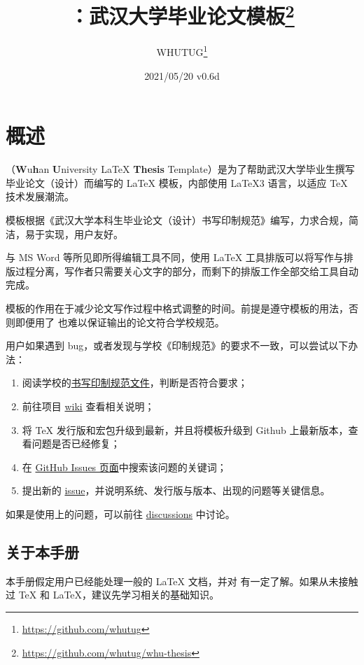 \documentclass{fdudoc}
\title{\cls{whu-thesis}\bfseries ：武汉大学毕业论文模板\thanks{\url{https://github.com/whutug/whu-thesis}}}
\author{WHUTUG\thanks{\url{https://github.com/whutug}}}
\date{2021/05/20 \quad v0.6d}
\begin{document}
\maketitle
\tableofcontents

\section{概述}
（\textbf{W}u\textbf{h}an \textbf{U}niversity \LaTeX{} \textbf{Thesis} Template）是为了帮助武汉大学毕业生撰写毕业论文（设计）而编写的 \LaTeX{} 模板，内部使用 \LaTeX3 语言，以适应 \TeX{} 技术发展潮流。

模板根据《武汉大学本科生毕业论文（设计）书写印制规范》编写，力求合规，简洁，易于实现，用户友好。

与 MS Word 等所见即所得编辑工具不同，使用 \LaTeX{} 工具排版可以将写作与排版过程分离，写作者只需要关心文字的部分，而剩下的排版工作全部交给工具自动完成。

模板的作用在于减少论文写作过程中格式调整的时间。前提是遵守模板的用法，否则即便用了  也难以保证输出的论文符合学校规范。

用户如果遇到 bug，或者发现与学校《印制规范》的要求不一致，可以尝试以下办法：
\begin{enumerate}
    \item 阅读学校的\href{https://github.com/mtobeiyf/whu-thesis/files/4638713/default.pdf}{书写印制规范文件}，判断是否符合要求；
    \item 前往项目 \href{https://github.com/mtobeiyf/whu-thesis/wiki}{wiki} 查看相关说明；
    \item 将 \TeX{} 发行版和宏包升级到最新，并且将模板升级到 Github 上最新版本，查看问题是否已经修复；
    \item 在 \href{https://github.com/mtobeiyf/whu-thesis/issues}{GitHub Issues 页面}中搜索该问题的关键词；
    \item 提出新的 \href{https://github.com/mtobeiyf/whu-thesis/issues}{issue}，并说明系统、发行版与版本、出现的问题等关键信息。
\end{enumerate}
如果是使用上的问题，可以前往 \href{https://github.com/whutug/whu-thesis/discussions}{discussions} 中讨论。

\subsection*{关于本手册}
本手册假定用户已经能处理一般的 \LaTeX{} 文档，并对 \BibTeX{} 有一定了解。如果从未接触过 \TeX{} 和 \LaTeX{}，建议先学习相关的基础知识。
\end{document}
